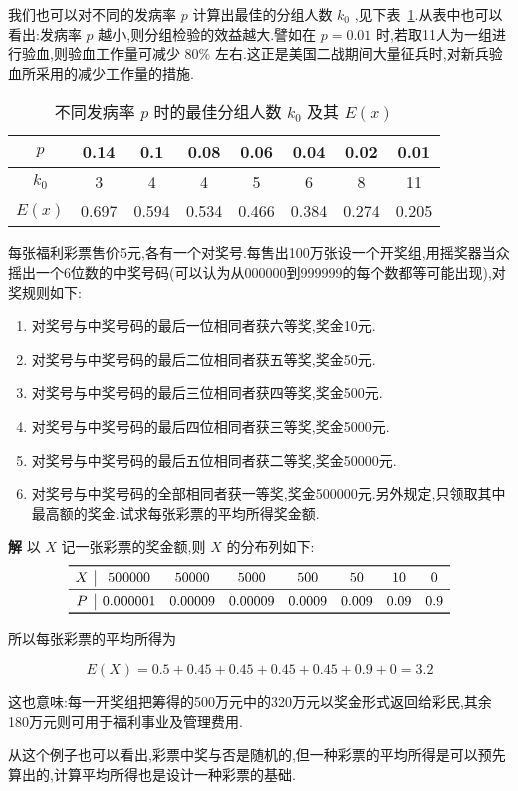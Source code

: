 我们也可以对不同的发病率 $ p $ 计算出最佳的分组人数 $ k_0 $ ,见下表~\ref{tab:2.2.2}.从表中也可以看出:发病率 $ p $ 越小,则分组检验的效益越大.譬如在 $ p=0.01 $ 时,若取11人为一组进行验血,则验血工作量可减少 $ 80\% $ 左右.这正是美国二战期间大量征兵时,对新兵验血所采用的减少工作量的措施.

\begin{table}[htbp]
	\centering
	\caption{不同发病率 $ p $ 时的最佳分组人数 $ k_0 $ 及其 $ E(x) $ }
	\begin{tabular}{c|ccccccc}
		\toprule
		 $ p $ & 0.14  & 0.1   & 0.08  & 0.06  & 0.04  & 0.02  & 0.01 \\\midrule
		 $ k_0 $ & 3     & 4     & 4     & 5     & 6     & 8     & 11 \\\midrule
		 $ E(x) $ & 0.697 & 0.594 & 0.534 & 0.466 & 0.384 & 0.274 & 0.205 \\\bottomrule
	\end{tabular}%
	\label{tab:2.2.2}%
\end{table}%

\begin{example}\label{exam:2.2.3}
	每张福利彩票售价5元,各有一个对奖号.每售出100万张设一个开奖组,用摇奖器当众摇出一个6位数的中奖号码(可以认为从000000到999999的每个数都等可能出现),对奖规则如下:
	\begin{enumerate}
		\item 对奖号与中奖号码的最后一位相同者获六等奖,奖金10元.
		\item 对奖号与中奖号码的最后二位相同者获五等奖,奖金50元.
		\item 对奖号与中奖号码的最后三位相同者获四等奖,奖金500元.
		\item 对奖号与中奖号码的最后四位相同者获三等奖,奖金5000元.
		\item 对奖号与中奖号码的最后五位相同者获二等奖,奖金50000元.
		\item 对奖号与中奖号码的全部相同者获一等奖,奖金500000元.另外规定,只领取其中最高额的奖金.试求每张彩票的平均所得奖金额.
	\end{enumerate}
	
	\textbf{解} 以 $ X $ 记一张彩票的奖金额,则 $ X $ 的分布列如下:
	\[
	\begin{array}{c|ccccccc}
	\toprule
	X     & 500000 & 50000 & 5000  & 500   & 50    & 10    & 0 \\\midrule
	P     & 0.000001 & 0.00009 & 0.00009 & 0.0009 & 0.009 & 0.09  & 0.9 \\\bottomrule
	\end{array}
	\]
	
	
	所以每张彩票的平均所得为
	
	\[ 
	E(X)=0.5+0.45+0.45+0.45+0.45+0.9+0=3.2
	\]
	
	这也意味:每一开奖组把筹得的500万元中的320万元以奖金形式返回给彩民,其余180万元则可用于福利事业及管理费用.
	
	从这个例子也可以看出,彩票中奖与否是随机的,但一种彩票的平均所得是可以预先算出的,计算平均所得也是设计一种彩票的基础.
	
\end{example}

